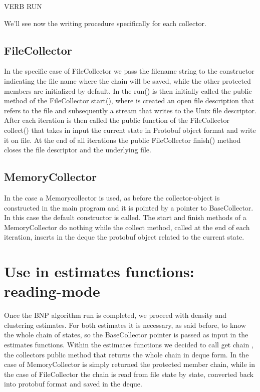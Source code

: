 VERB RUN

We'll see now the writing procedure specifically for each collector. 

\subsection{FileCollector}

In the specific case of FileCollector we pass the filename string to the constructor indicating the file name where the chain will be saved, while the other protected members are initialized by default. In the run() is then initially called the public method of the FileCollector start(), where is created an open file description that refers to the file and subsequently a stream that writes to the Unix file descriptor. After each iteration is then called the public function of the FileCollector collect() that takes in input the current state in Protobuf object format and write it on file. At the end of all iterations the public FileCollector finish() method closes the file descriptor and the underlying file. 

\subsection{MemoryCollector}
In the case a Memorycollector is used, as before the collector-object is constructed in the main program and it is pointed by a pointer to BaseCollector. In this case the default constructor is called. The start and finish methods of a MemoryCollector do nothing while the collect method, called at the end of each iteration, inserts in the deque the protobuf object related to the current state.

\section{Use in estimates functions: reading-mode}
Once the BNP algorithm run is completed, we proceed with density and clustering estimates. For both estimates it is necessary, as said before, to know the whole chain of states, so the BaseCollector pointer is passed as input in the estimates functions. Within the estimates functions we decided to call get chain , the collectors public method that returns the whole chain in deque form. In the case of MemoryCollector is simply returned the protected member chain, while in the case of FileCollector the chain is read from file state by state, converted back into protobuf format and saved in the deque.

